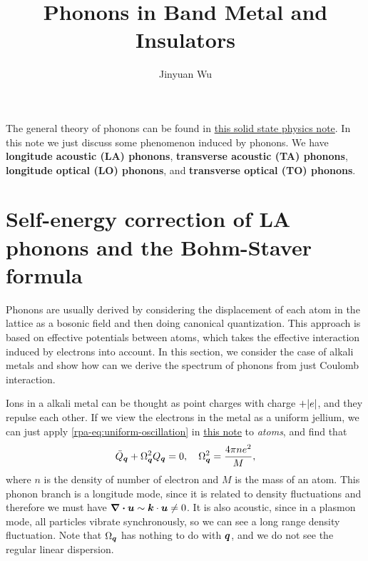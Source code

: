 \documentclass[hyperref, a4paper]{article}
\title{Phonons in Band Metal and Insulators}
\author{Jinyuan Wu}
\newcommand*{\concept}[1]{{\textbf{#1}}}
\newcommand{\soliddoc}{\href{../solid/solid.pdf}{this solid state physics note}}
\newcommand{\rpanote}{\href{./electron-gas.pdf}{this note}}
\begin{document}
\maketitle

The general theory of phonons can be found in \soliddoc. In this note we just discuss some phenomenon induced by 
phonons. We have \concept{longitude acoustic (LA) phonons}, \concept{transverse acoustic (TA) phonons},
\concept{longitude optical (LO) phonons}, and \concept{transverse optical (TO) phonons}.

\section{Self-energy correction of LA phonons and the Bohm-Staver formula}

Phonons are usually derived by considering the displacement of each atom in the lattice as a bosonic field and 
then doing canonical quantization. This approach is based on effective potentials between atoms, which takes the 
effective interaction induced by electrons into account. In this section, we consider the case of alkali metals
and show how can we derive the spectrum of phonons from just Coulomb interaction.

Ions in a alkali metal can be thought as point charges with charge $+\abs{e}$, and they repulse each other. 
If we view the electrons in the metal as a uniform jellium, we can just apply \eqref{rpa-eq:uniform-oscillation} in \rpanote
to \emph{atoms}, and find that 
\begin{equation}
    \ddot{Q}_{\vb*{q}} + \Omega^2_{\vb*{q}} Q_{\vb*{q}} = 0, \quad \Omega^2_{\vb*{q}} = \frac{4 \pi n e^2}{M},
\end{equation}
where $n$ is the density of number of electron and $M$ is the mass of an atom. 
This phonon branch is a longitude mode, since it is related to density fluctuations and therefore we must have 
$\div{\vb*{u}} \sim \vb*{k} \cdot \vb*{u} \neq 0$. It is also acoustic, since in a plasmon mode, 
all particles vibrate synchronously, so we can see a long range density fluctuation.
Note that $\Omega_{\vb*{q}}$ has nothing to do with $\vb*{q}$, and we do not see the regular linear dispersion. 
\end{document}
